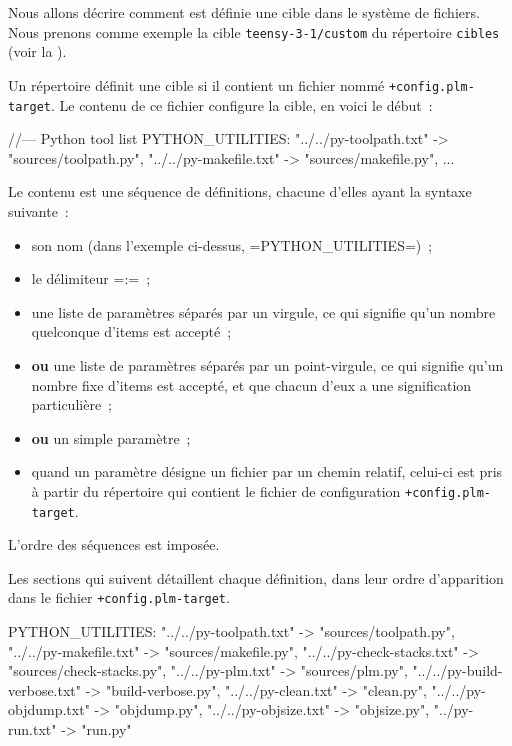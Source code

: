 Nous allons décrire comment est définie une cible dans le système de fichiers. Nous prenons comme exemple la cible \texttt{teensy-3-1/custom} du répertoire \texttt{cibles} (voir la ).

Un répertoire définit une cible si il contient un fichier nommé \texttt{+config.plm-target}. Le contenu de ce fichier configure la cible, en voici le début~:

\begin{PLM}
//--- Python tool list
PYTHON_UTILITIES:
   "../../py-toolpath.txt" -> "sources/toolpath.py",
   "../../py-makefile.txt" -> "sources/makefile.py",
   ...
\end{PLM}


Le contenu est une séquence de définitions, chacune d'elles ayant la syntaxe suivante~:
\begin{itemize}
  \item son nom (dans l'exemple ci-dessus, \plm=PYTHON_UTILITIES=)~;
  \item le délimiteur \plm=:=~;
  \item une liste de paramètres séparés par un virgule, ce qui signifie qu'un nombre quelconque d'items est accepté~;
  \item {\bf ou} une liste de paramètres séparés par un point-virgule, ce qui signifie qu'un nombre fixe d'items est accepté, et que chacun d'eux a une signification particulière~;
  \item {\bf ou} un simple paramètre~;
  \item quand un paramètre désigne un fichier par un chemin relatif, celui-ci est pris à partir du répertoire qui contient le fichier de configuration \texttt{+config.plm-target}.
\end{itemize}

L'ordre des séquences est imposée.

Les sections qui suivent détaillent chaque définition, dans leur ordre d'apparition dans le fichier \texttt{+config.plm-target}.











\begin{PLM}
PYTHON_UTILITIES:
   "../../py-toolpath.txt" -> "sources/toolpath.py",
   "../../py-makefile.txt" -> "sources/makefile.py",
   "../../py-check-stacks.txt" -> "sources/check-stacks.py",
   "../../py-plm.txt" -> "sources/plm.py",
   "../../py-build-verbose.txt" -> "build-verbose.py",
   "../../py-clean.txt" -> "clean.py",
   "../../py-objdump.txt" -> "objdump.py",
   "../../py-objsize.txt" -> "objsize.py",
   "../py-run.txt" -> "run.py"
\end{PLM}

